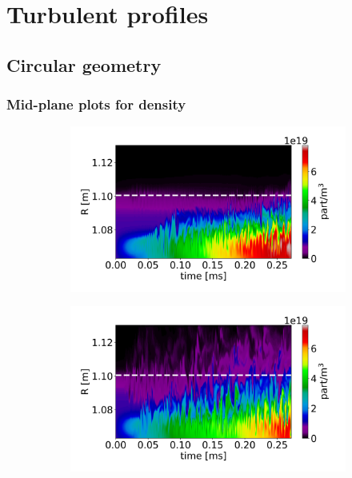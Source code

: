 \chapter{Turbulent profiles}
\label{app:turbulentProfiles}

\section{Circular geometry}

\subsection{Mid-plane plots for density}
\label{sec:turbulentProfiles_CIRC}

\begin{figure}[H]\centering
	\begin{subfigure}[t]{0.45\textwidth}
		\centering
		\includegraphics[width=1\textwidth]{schemes/plotOMPtime_spec1_n_PHI.jpg}
	\end{subfigure}
	\begin{subfigure}[t]{0.45\textwidth}
		\centering
		\includegraphics[width=1\textwidth]{schemes/plotOMPtime_spec1_n_PHIJ_mass_1.jpg}

\end{subfigure}
\end{figure}
